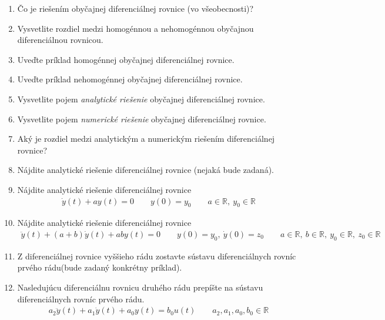 \documentclass[a4paper, 10pt, ]{article}
\begin{document}
\begin{enumerate}[leftmargin=0pt, labelsep=3mm, itemsep=0pt]
    
    \item Čo je riešením obyčajnej diferenciálnej rovnice (vo všeobecnosti)?

    \item Vysvetlite rozdiel medzi homogénnou a nehomogénnou obyčajnou diferenciálnou rovnicou.

    \item Uveďte príklad homogénnej obyčajnej diferenciálnej rovnice.

    \item Uveďte príklad nehomogénnej obyčajnej diferenciálnej rovnice.

    \item Vysvetlite pojem \emph{analytické riešenie} obyčajnej diferenciálnej rovnice.

    \item Vysvetlite pojem \emph{numerické riešenie} obyčajnej diferenciálnej rovnice.

    \item Aký je rozdiel medzi analytickým a numerickým riešením diferenciálnej rovnice?

	\item Nájdite analytické riešenie diferenciálnej rovnice (nejaká bude zadaná).
	
    \item Nájdite analytické riešenie diferenciálnej rovnice
    \begin{align*}
        \dot y(t) + a y(t) = 0 \qquad y(0) = y_0 \qquad a\in\mathbb R,\ y_0\in\mathbb R
    \end{align*}

    \item Nájdite analytické riešenie diferenciálnej rovnice
    \begin{align*}
        \ddot y(t) + (a+b) \dot y(t) + ab y(t) = 0 \qquad y(0) = y_0,\ \dot y(0) = z_0  \qquad a\in\mathbb R,\ b\in\mathbb R,\ y_0\in\mathbb R,\ z_0\in\mathbb R
    \end{align*}

    \item Z diferenciálnej rovnice vyššieho rádu zostavte sústavu diferenciálnych rovníc prvého rádu(bude zadaný konkrétny príklad).
    
    \item Nasledujúcu diferenciálnu rovnicu druhého rádu prepíšte na sústavu diferenciálnych rovníc prvého rádu.
    \begin{align*}
        a_2 \ddot y(t) + a_1 \dot y(t) + a_0 y(t) = b_0 u(t) \qquad a_2, a_1, a_0, b_0 \in\mathbb R
    \end{align*}


\end{enumerate}
\end{document}
